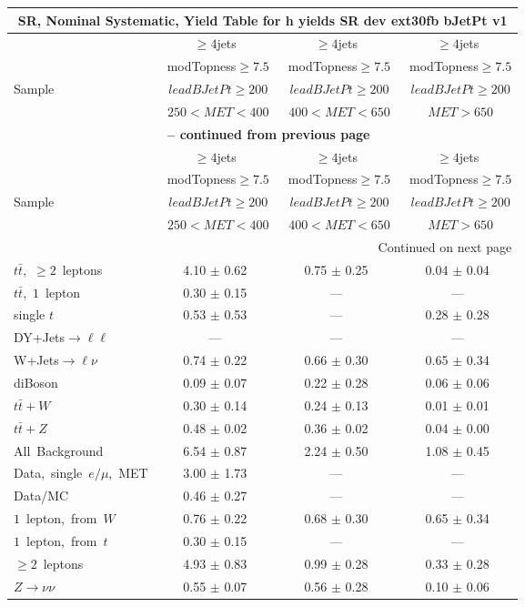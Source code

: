 \documentclass{article}
\begin{document}
\begin{longtable}{|l|c|c|c|} 
 
\multicolumn{4}{c}{ SR, Nominal Systematic, Yield Table for h yields SR dev ext30fb bJetPt v1 }\\* \hline 
  & $\ge4$jets  & $\ge4$jets  & $\ge4$jets \\* 
  & ~modTopness$\ge7.5$  & ~modTopness$\ge7.5$  & ~modTopness$\ge7.5$ \\* 
Sample  & ~$leadBJetPt\ge200$  & ~$leadBJetPt\ge200$  & ~$leadBJetPt\ge200$ \\* 
  & ~$250<MET<400$  & ~$400<MET<650$  & ~$MET>650$ \\* 
\hline \hline 
\endfirsthead 
 
\multicolumn{4}{c}{{\bfseries \tablename\ \thetable{} -- continued from previous page}}\\* \hline 
  & $\ge4$jets  & $\ge4$jets  & $\ge4$jets \\* 
  & ~modTopness$\ge7.5$  & ~modTopness$\ge7.5$  & ~modTopness$\ge7.5$ \\* 
Sample  & ~$leadBJetPt\ge200$  & ~$leadBJetPt\ge200$  & ~$leadBJetPt\ge200$ \\* 
  & ~$250<MET<400$  & ~$400<MET<650$  & ~$MET>650$ \\* 
\hline \hline 
\endhead 
 
\multicolumn{4}{|r|}{{Continued on next page}}\\* \hline 
\endfoot 
 
 
\endlastfoot 
 
$t\bar{t}$,~$\ge2$~leptons & 4.10 $\pm$ 0.62  & 0.75 $\pm$ 0.25  & 0.04 $\pm$ 0.04 \\* 
$t\bar{t}$,~$1$~lepton & 0.30 $\pm$ 0.15  & ---  & --- \\* 
single $t$  & 0.53 $\pm$ 0.53  & ---  & 0.28 $\pm$ 0.28 \\* 
DY+Jets$\rightarrow\ell\ell$  & ---  & ---  & --- \\* 
W+Jets$\rightarrow\ell\nu$  & 0.74 $\pm$ 0.22  & 0.66 $\pm$ 0.30  & 0.65 $\pm$ 0.34 \\* 
diBoson  & 0.09 $\pm$ 0.07  & 0.22 $\pm$ 0.28  & 0.06 $\pm$ 0.06 \\* 
$t\bar{t}+W$  & 0.30 $\pm$ 0.14  & 0.24 $\pm$ 0.13  & 0.01 $\pm$ 0.01 \\* 
$t\bar{t}+Z$  & 0.48 $\pm$ 0.02  & 0.36 $\pm$ 0.02  & 0.04 $\pm$ 0.00 \\* 
\hline \hline 
All~Background  & 6.54 $\pm$ 0.87  & 2.24 $\pm$ 0.50  & 1.08 $\pm$ 0.45 \\* 
Data,~single~$e/\mu$,~MET  & 3.00 $\pm$ 1.73  & ---  & --- \\* 
Data/MC  & 0.46 $\pm$ 0.27  & ---  & --- \\* 
\hline \hline 
$1$~lepton,~from~$W$  & 0.76 $\pm$ 0.22  & 0.68 $\pm$ 0.30  & 0.65 $\pm$ 0.34 \\* 
$1$~lepton,~from~$t$  & 0.30 $\pm$ 0.15  & ---  & --- \\* 
$\ge2$~leptons  & 4.93 $\pm$ 0.83  & 0.99 $\pm$ 0.28  & 0.33 $\pm$ 0.28 \\* 
$Z\rightarrow\nu\nu$  & 0.55 $\pm$ 0.07  & 0.56 $\pm$ 0.28  & 0.10 $\pm$ 0.06 \\* 
\hline 
\end{longtable} 
\end{document}
